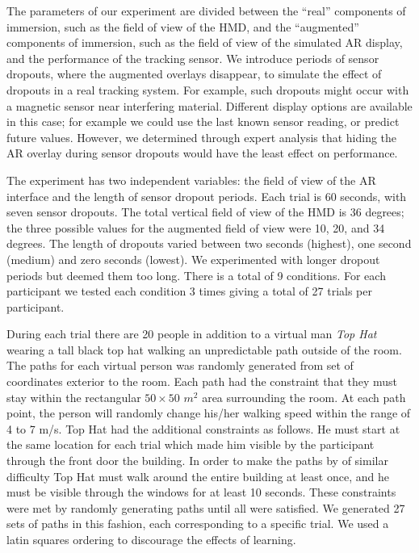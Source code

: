 \documentclass{acmsiggraph}                     %
\begin{document}
The parameters of our experiment are divided between the ``real'' components of immersion, such as the field of view of the HMD, and the ``augmented'' components of immersion, such as the field of view of the simulated AR display, and the performance of the tracking sensor.  We introduce periods of sensor dropouts, where the augmented overlays disappear, to simulate the effect of dropouts in a real tracking system.  For example, such dropouts might occur with a magnetic sensor near interfering material.  Different display options are available in this case; for example we could use the last known sensor reading, or predict future values.
However, we determined through expert analysis that hiding the AR overlay during sensor dropouts would have the least effect on performance.

The experiment has two independent variables: the field of view of the AR interface and the length of sensor dropout periods.  Each trial is 60 seconds, with seven sensor dropouts.  The total vertical field of view of the HMD is 36 degrees; the three possible values for the augmented field of view were 10, 20, and 34 degrees.  The length of dropouts varied between two seconds (highest), one second (medium) and zero seconds (lowest).  We experimented with longer dropout periods but deemed them too long.  There is a total of 9 conditions.  For each participant we tested each condition 3 times giving a total of 27 trials per participant.

During each trial there are 20 people in addition to a virtual man \emph{Top Hat} wearing a tall black top hat walking an unpredictable path outside of the room.  The paths for each virtual person was randomly generated from set of coordinates exterior to the room.  Each path had the constraint that they must stay within the rectangular $50\times50$ $m^2$ area surrounding the room.  At each path point, the person will randomly change his/her walking speed within the range of 4 to 7 m/s.  Top Hat had the additional constraints as follows.  He must start at the same location for each trial which made him visible by the participant through the front door the building.  In order to make the paths by of similar difficulty Top Hat must walk around the entire building at least once, and he must be visible through the windows for at least 10 seconds.  These constraints were met by randomly generating paths until all were satisfied.  We generated 27 sets of paths in this fashion, each corresponding to a specific trial.  We used a latin squares ordering to discourage the effects of learning.
\end{document}
